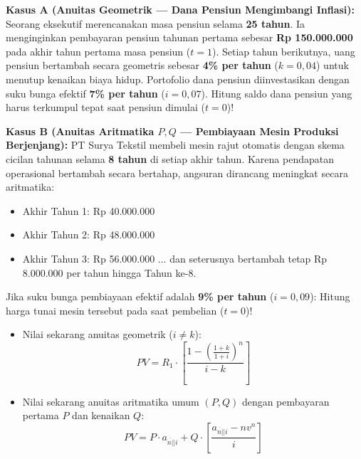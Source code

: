\documentclass[11pt,a4paper]{article}
\newcommand{\angl}[1]{\overline{#1|}}
\begin{document}
\begin{soalbox}
\textbf{Kasus A (Anuitas Geometrik --- Dana Pensiun Mengimbangi Inflasi):}  
Seorang eksekutif merencanakan masa pensiun selama \textbf{25 tahun}. Ia menginginkan pembayaran pensiun tahunan pertama sebesar \textbf{Rp 150.000.000} pada akhir tahun pertama masa pensiun ($t=1$). Setiap tahun berikutnya, uang pensiun bertambah secara geometris sebesar \textbf{4\% per tahun} ($k = 0{,}04$) untuk menutup kenaikan biaya hidup. Portofolio dana pensiun diinvestasikan dengan suku bunga efektif \textbf{7\% per tahun} ($i = 0{,}07$).  
Hitung saldo dana pensiun yang harus terkumpul tepat saat pensiun dimulai ($t=0$)!

\textbf{Kasus B (Anuitas Aritmatika $P, Q$ --- Pembiayaan Mesin Produksi Berjenjang):}  
PT Surya Tekstil membeli mesin rajut otomatis dengan skema cicilan tahunan selama \textbf{8 tahun} di setiap akhir tahun. Karena pendapatan operasional bertambah secara bertahap, angsuran dirancang meningkat secara aritmatika:
\begin{itemize}[leftmargin=5mm, topsep=1pt, itemsep=1pt]
    \item Akhir Tahun 1: Rp 40.000.000
    \item Akhir Tahun 2: Rp 48.000.000
    \item Akhir Tahun 3: Rp 56.000.000 $\dots$ dan seterusnya bertambah tetap Rp 8.000.000 per tahun hingga Tahun ke-8.
\end{itemize}
Jika suku bunga pembiayaan efektif adalah \textbf{9\% per tahun} ($i = 0{,}09$):  
Hitung harga tunai mesin tersebut pada saat pembelian ($t=0$)!
\end{soalbox}

\begin{petunjukbox}
\begin{itemize}[leftmargin=4mm, topsep=1pt, itemsep=1pt]
    \item Nilai sekarang anuitas geometrik ($i \neq k$):
    $$PV = R_1 \cdot \left[ \frac{1 - \left(\frac{1+k}{1+i}\right)^n}{i - k} \right]$$
    \item Nilai sekarang anuitas aritmatika umum $(P, Q)$ dengan pembayaran pertama $P$ dan kenaikan $Q$:
    $$PV = P \cdot a_{\angl{n}|i} + Q \cdot \left[ \frac{a_{\angl{n}|i} - n v^n}{i} \right]$$
\end{itemize}
\end{petunjukbox}
\end{document}

